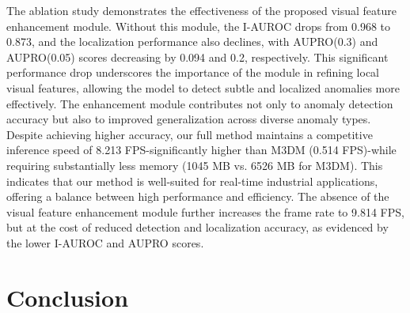 The ablation study demonstrates the effectiveness of the proposed visual feature enhancement module. Without this module, the I-AUROC drops from 0.968 to 0.873, and the localization performance also declines, with AUPRO(0.3) and AUPRO(0.05) scores decreasing by 0.094 and 0.2, respectively. This significant performance drop underscores the importance of the module in refining local visual features, allowing the model to detect subtle and localized anomalies more effectively. The enhancement module contributes not only to anomaly detection accuracy but also to improved generalization across diverse anomaly types. Despite achieving higher accuracy, our full method maintains a competitive inference speed of 8.213 FPS-significantly higher than M3DM (0.514 FPS)-while requiring substantially less memory (1045 MB vs. 6526 MB for M3DM). This indicates that our method is well-suited for real-time industrial applications, offering a balance between high performance and efficiency. The absence of the visual feature enhancement module further increases the frame rate to 9.814 FPS, but at the cost of reduced detection and localization accuracy, as evidenced by the lower I-AUROC and AUPRO scores.

\section*{Conclusion}
\label{sec:Conclusion}

